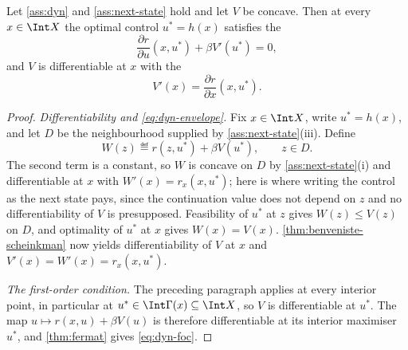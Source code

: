 \begin{theorem}\label{thm:euler-envelope}
	Let \autoref{ass:dyn} and \autoref{ass:next-state} hold and let $V$ be concave.
	Then at every $x\in\Int X$ the optimal control $u^{\ast}=h(x)$ satisfies the
	\begin{equation}\label{eq:dyn-foc}
		\frac{\partial r}{\partial u}(x,u^{\ast})+\beta V'(u^{\ast})=0,
	\end{equation}
	and $V$ is differentiable at $x$ with the 
	\begin{equation}\label{eq:dyn-envelope}
		V'(x)=\frac{\partial r}{\partial x}(x,u^{\ast}) .
	\end{equation}
\end{theorem}

\begin{proof}
	\emph{Differentiability and \eqref{eq:dyn-envelope}.} Fix $x\in\Int X$, write
	$u^{\ast}=h(x)$, and let $D$ be the neighbourhood supplied by
	\autoref{ass:next-state}(iii). Define
	\[
		W(z)\eqdef r(z,u^{\ast})+\beta V(u^{\ast}),\qquad z\in D .
	\]
	The second term is a constant, so $W$ is concave on $D$ by
	\autoref{ass:next-state}(i) and differentiable at $x$ with
	$W'(x)=r_x(x,u^{\ast})$; here is where writing the control as the next state
	pays, since the continuation value does not depend on $z$ and no
	differentiability of $V$ is presupposed. Feasibility of $u^{\ast}$ at $z$ gives
	$W(z)\leq V(z)$ on $D$, and optimality of $u^{\ast}$ at $x$ gives $W(x)=V(x)$.
	\autoref{thm:benveniste-scheinkman} now yields differentiability of $V$ at $x$
	and $V'(x)=W'(x)=r_x(x,u^{\ast})$.

	\emph{The first-order condition.} The preceding paragraph applies at every
	interior point, in particular at $u^{\ast}\in\Int\Gamma(x)\subseteq\Int X$, so
	$V$ is differentiable at $u^{\ast}$. The map
	$u\mapsto r(x,u)+\beta V(u)$ is therefore differentiable at its interior
	maximiser $u^{\ast}$, and \autoref{thm:fermat} gives \eqref{eq:dyn-foc}.
\end{proof}

